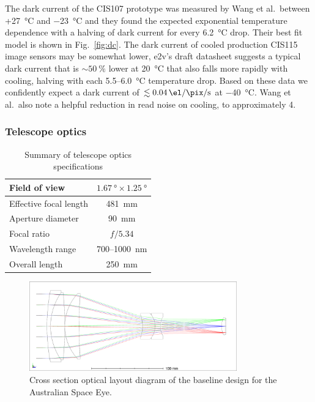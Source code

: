 \documentclass[]{iac}
\begin{document}
The dark current of the CIS107 prototype was measured by Wang et al.\ between +\SI{27}{\celsius} and \SI{-23}{\celsius}
and they found the expected exponential temperature dependence with a halving of dark current for every
\SI{6.2}{\celsius} drop. Their best fit model is shown in Fig.~\ref{fig:dc}. The dark current of cooled production
CIS115 image sensors may be somewhat lower, e2v's draft datasheet suggests a typical dark current that is
$\sim\SI{50}{\percent}$ lower at \SI{20}{\celsius} that also falls more rapidly with cooling, halving with each
5.5--\SI{6.0}{\celsius} temperature drop. Based on these data we confidently expect a dark current of
$\lesssim\SI{0.04}{\el\per\pix\per\second}$ at \SI{-40}{\celsius}. Wang et al.\ also note a helpful reduction in read
noise on cooling, to approximately \SI{4}{\el}.

\subsubsection{Telescope optics}

\begin{table}[p]
  \caption{Summary of telescope optics specifications}
  \label{tab:optics}
  \begin{center}
    \begin{tabular}{|l|c|}
      \hline \rule[-1ex]{0pt}{3.5ex} Field of view &  $\SI{1.67}{\degree} \times \SI{1.25}{\degree}$ \\
      \hline \rule[-1ex]{0pt}{3.5ex} Effective focal length & \SI{481}{\milli\metre} \\
      \hline \rule[-1ex]{0pt}{3.5ex} Aperture diameter & \SI{90}{\milli\metre} \\
      \hline \rule[-1ex]{0pt}{3.5ex} Focal ratio & $f/5.34$ \\
      \hline \rule[-1ex]{0pt}{3.5ex} Wavelength range & 700--\SI{1000}{\nano\metre} \\
      \hline \rule[-1ex]{0pt}{3.5ex}  Overall length & \SI{250}{\milli\metre} \\
      \hline
    \end{tabular}
  \end{center}
\end{table}

\begin{figure}[p]
  \center \includegraphics[width=0.8\textwidth]{figures/spie-layout.png}
  \caption{\label{fig:optics}Cross section optical layout diagram of the baseline design for the Australian Space Eye.}
\end{figure}
\end{document}
